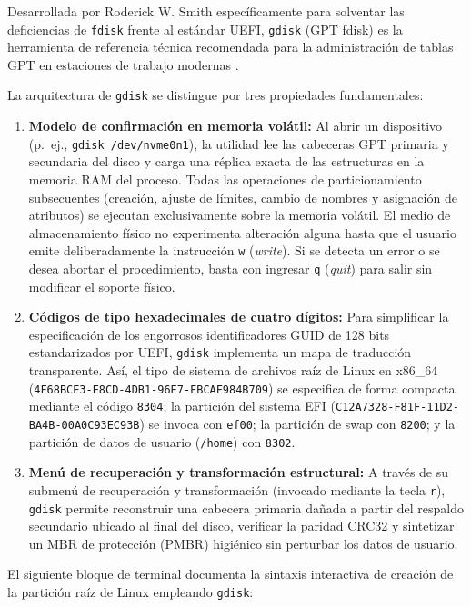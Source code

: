 \documentclass[12pt]{article}
\begin{document}
Desarrollada por Roderick W. Smith específicamente para solventar las deficiencias de \texttt{fdisk} frente al estándar UEFI, \texttt{gdisk} (GPT fdisk) es la herramienta de referencia técnica recomendada para la administración de tablas GPT en estaciones de trabajo modernas \parencite{smith2022gdisk}.

La arquitectura de \texttt{gdisk} se distingue por tres propiedades fundamentales:
\begin{enumerate}[noitemsep, topsep=2pt]
    \item \textbf{Modelo de confirmación en memoria volátil:} Al abrir un dispositivo (p.~ej., \texttt{gdisk /dev/\allowbreak nvme0n1}), la utilidad lee las cabeceras GPT primaria y secundaria del disco y carga una réplica exacta de las estructuras en la memoria RAM del proceso. Todas las operaciones de particionamiento subsecuentes (creación, ajuste de límites, cambio de nombres y asignación de atributos) se ejecutan exclusivamente sobre la memoria volátil. El medio de almacenamiento físico no experimenta alteración alguna hasta que el usuario emite deliberadamente la instrucción \texttt{w} (\textit{write}). Si se detecta un error o se desea abortar el procedimiento, basta con ingresar \texttt{q} (\textit{quit}) para salir sin modificar el soporte físico.
    \item \textbf{Códigos de tipo hexadecimales de cuatro dígitos:} Para simplificar la especificación de los engorrosos identificadores GUID de 128 bits estandarizados por UEFI, \texttt{gdisk} implementa un mapa de traducción transparente. Así, el tipo de sistema de archivos raíz de Linux en x86\_64 (\texttt{4F68BCE3-E8CD-4DB1-96E7-FBCAF984B709}) se especifica de forma compacta mediante el código \texttt{8304}; la partición del sistema EFI (\texttt{C12A7328-F81F-11D2-BA4B-00A0C93EC93B}) se invoca con \texttt{ef00}; la partición de swap con \texttt{8200}; y la partición de datos de usuario (\texttt{/home}) con \texttt{8302}.
    \item \textbf{Menú de recuperación y transformación estructural:} A través de su submenú de recuperación y transformación (invocado mediante la tecla \texttt{r}), \texttt{gdisk} permite reconstruir una cabecera primaria dañada a partir del respaldo secundario ubicado al final del disco, verificar la paridad CRC32 y sintetizar un MBR de protección (PMBR) higiénico sin perturbar los datos de usuario.
\end{enumerate}

El siguiente bloque de terminal documenta la sintaxis interactiva de creación de la partición raíz de Linux empleando \texttt{gdisk}:
\end{document}
